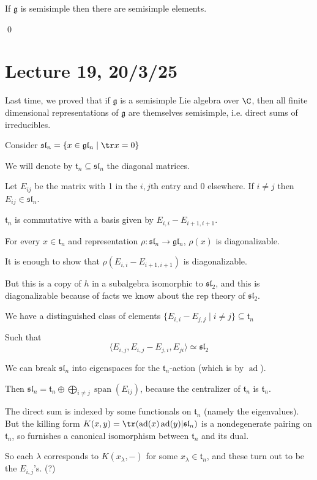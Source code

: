 \documentclass[x11names,reqno,14pt]{extarticle}
\newcommand{\mk}[1]{\mathfrak{#1}}
\newcommand{\g}{\mk{g}}
\DeclareMathOperator{\ad}{ad}
\newcommand{\gl}{\mk{g}\mk{l}}
\renewcommand{\sl}{\mk{s}\mk{l}}
\DeclareMathOperator{\Span}{span}
\begin{document}
\cor

If $\g$ is semisimple then there are semisimple elements. 

\proof

\qed

\section*{Lecture 19, 20/3/25}

Last time, we proved that if $\g$ is a semisimple Lie algebra over $\C$, then all finite dimensional representations of $\g$ are themselves semisimple, i.e. direct sums of irreducibles. 

\exm

Consider $\sl_n = \{x\in\gl_n \mid \tr x = 0 \}$

We will denote by $\mk{t}_n \subseteq \sl_n$ the diagonal matrices. 

Let $E_{ij}$ be the matrix with 1 in the $i, j$th entry and 0 elsewhere. If $i\neq j$ then $E_{ij} \in \sl_n$. 

$\mk{t}_n$ is commutative with a basis given by $E_{i,i} - E_{i+1,i+1}$.

\prop

For every $x \in \mk{t}_n$ and representation $\rho:\sl_n\to\gl_n$, $\rho(x)$ is diagonalizable.

\proof

It is enough to show that $\rho(E_{i,i} - E_{i+1,i+1})$ is diagonalizable. 

But this is a copy of $h$ in a subalgebra isomorphic to $\sl_2$, and this is diagonalizable because of facts we know about the rep theory of $\sl_2$. 

We have a distinguished class of elements $\{E_{i,i}- E_{j,j} \mid i \neq j \}\subseteq \mk{t}_n$

Such that 
\[
\langle E_{i,j}, E_{i,j} - E_{j,i}, E_{ji}\rangle \simeq \sl_2
\]

We can break $\sl_n$ into eigenspaces for the $\mk{t}_n$-action (which is by $\ad$). 

Then $\sl_n = \mk{t}_n \oplus \bigoplus_{i\neq j}\Span(E_{ij})$, because the centralizer of $\mk{t}_n$ is $\mk{t}_n$. 

The direct sum is indexed by some functionals on $\mk{t}_n$ (namely the eigenvalues). But the killing form $K(x,y) = \tr(\ad(x)\ad(y)|\sl_n)$ is a nondegenerate pairing on $\mk{t}_n$, so furnishes a canonical isomorphism between $\mk{t}_n$ and its dual. 

So each $\lambda$ corresponds to $K(x_\lambda,-)$ for some $x_\lambda \in \mk{t}_n$, and these turn out to be the $E_{i,j}$'s. (?)
\end{document}
